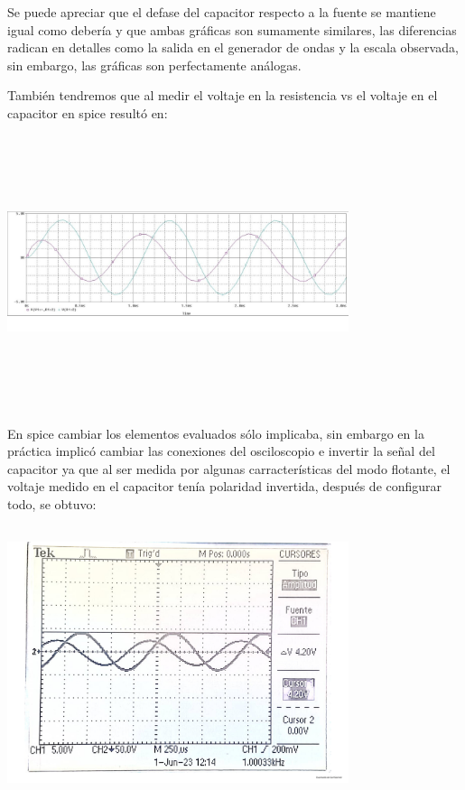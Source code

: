 \documentclass[12pt]{article}
\begin{document}
	\noindent Se puede apreciar que el defase del capacitor respecto a la fuente se mantiene igual como debería y que ambas gráficas son sumamente similares, las diferencias radican en detalles como la salida en el generador de ondas y la escala observada, sin embargo, las gráficas son perfectamente análogas.
	
	\noindent También tendremos que al medir el voltaje en la resistencia vs el voltaje en el capacitor en spice resultó en:
	
	\begin{center}
		\includegraphics[width=10cm,height=8cm]{Img/capacitor_resistencia_spice}
	\end{center}
	
	\noindent En spice cambiar los elementos evaluados sólo implicaba, sin embargo en la práctica implicó cambiar las conexiones del osciloscopio e invertir la señal del capacitor ya que al ser medida por algunas carracterísticas del modo flotante, el voltaje medido en el capacitor tenía polaridad invertida, después de configurar todo, se obtuvo:
	
	\begin{center}
		\includegraphics[width=10cm,height=8cm]{Img/capacitor_resistencia}
	\end{center}
\end{document}
